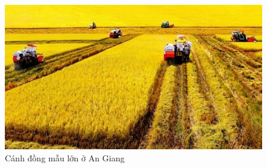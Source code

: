 \begin{figure}[H]
	\centering
	\includegraphics[scale=.5]{Chapter 1/image chapter 1/canhdongMauLon.jpg}
	\caption[Cánh đồng mẫu lớn ở An Giang]{Cánh đồng mẫu lớn ở An Giang}
\end{figure}
